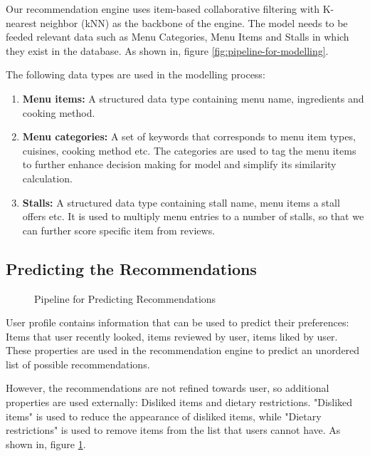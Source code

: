 Our recommendation engine uses item-based collaborative filtering
with K-nearest neighbor (kNN) as the backbone of the engine. \cite{singhanddwivedi:2023}
The model needs to be feeded relevant data such as Menu Categories, Menu Items and Stalls in which they exist in
the database. As shown in, figure \ref{fig:pipeline-for-modelling}.

The following data types are used in the modelling process:

\begin{enumerate}[leftmargin=80pt]
    \item \textbf{Menu items:} A structured data type containing menu name, ingredients and cooking method.
    \item \textbf{Menu categories:} A set of keywords that corresponds to menu item types, cuisines, cooking method etc.
    The categories are used to tag the menu items to further enhance decision making for model and simplify its
    similarity calculation.
    \item \textbf{Stalls:} A structured data type containing stall name, menu items a stall offers etc.
    It is used to multiply menu entries to a number of stalls, so that we can further score specific item from reviews.
\end{enumerate}

\newpage

\subsection{Predicting the Recommendations}
\begin{figure}[h!]
    \centering
    
    \caption{Pipeline for Predicting Recommendations}
    \label{fig:pipeline-for-predicting}
\end{figure}

User profile contains information that can be used to predict their preferences: Items that user recently looked, items reviewed by user, items liked by user.
These properties are used in the recommendation engine to predict an unordered list of possible recommendations.

However, the recommendations are not refined towards user, so additional properties are used externally: Disliked items and dietary restrictions.
"Disliked items" is used to reduce the appearance of disliked items, while "Dietary restrictions" is used to remove items from the list that users
cannot have. As shown in, figure \ref{fig:pipeline-for-predicting}.